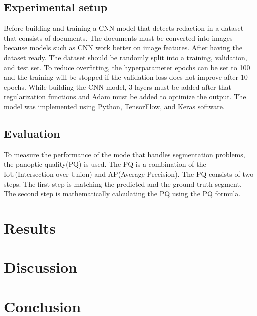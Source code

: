 \documentclass[sigconf,authordraft]{acmart}
\begin{document}
\subsection{Experimental setup}

Before building and training a CNN model that detects redaction in a dataset that consists of documents. The documents must be converted into images because models such as CNN work better on image features. After having the dataset ready. The dataset should be randomly split into a training, validation, and test set. To reduce overfitting, the hyperparameter epochs can be set to 100 and the training will be stopped if the validation loss does not improve after 10 epochs. While building the CNN model, 3 layers must be added after that regularization functions and Adam must be added to optimize the output. The model was implemented using Python, TensorFlow, and Keras software. 
\subsection{Evaluation}
To measure the performance of the mode that handles segmentation problems, the panoptic quality(PQ) is used. The PQ is a combination of the IoU(Intersection over Union) and AP(Average Precision). The PQ consists of two steps. The first step is matching the predicted and the ground truth segment. The second step is mathematically calculating the PQ using the PQ formula.
\cite{PQ}

\section{Results}

\section{Discussion}

\section{Conclusion}




 

 




 
\end{document}
